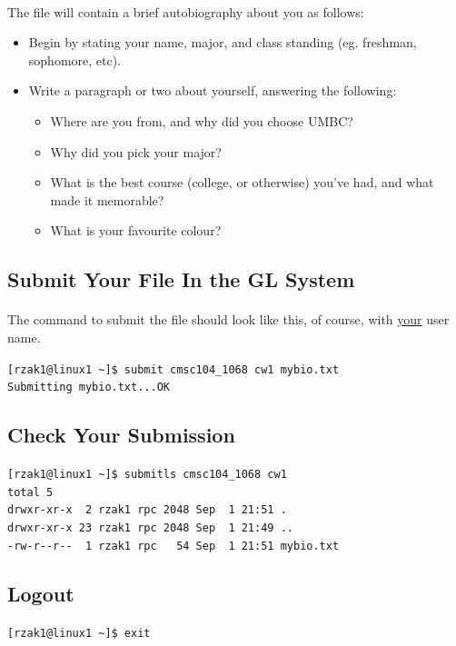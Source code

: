 \documentclass[letter,11pt]{article}
\begin{document}
\paragraph{}The file will contain a brief autobiography about you as follows:
\begin{itemize}
    \item Begin by stating your name, major, and class standing (eg. freshman, sophomore, etc).
    \item Write a paragraph or two about yourself, answering the following:
    \begin{itemize}
        \item Where are you from, and why did you choose UMBC?
        \item Why did you pick your major?
        \item What is the best course (college, or otherwise) you've had, and what made it memorable?
        \item What is your favourite colour?
    \end{itemize}
\end{itemize}

\subsection{Submit Your File In the GL System}
\paragraph{}The command to submit the file should look like this, of course, with \underline{your} user name.

\verb|[rzak1@linux1 ~]$ submit cmsc104_1068 cw1 mybio.txt| \\
\verb|Submitting mybio.txt...OK|

\subsection{Check Your Submission}
\verb|[rzak1@linux1 ~]$ submitls cmsc104_1068 cw1| \\
\verb|total 5| \\
\verb|drwxr-xr-x  2 rzak1 rpc 2048 Sep  1 21:51 .| \\
\verb|drwxr-xr-x 23 rzak1 rpc 2048 Sep  1 21:49 ..| \\
\verb|-rw-r--r--  1 rzak1 rpc   54 Sep  1 21:51 mybio.txt|

\subsection{Logout}
\verb|[rzak1@linux1 ~]$ exit| 
\end{document}
